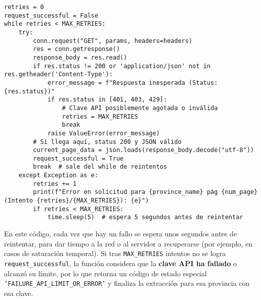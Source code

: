 \documentclass[a4paper,11pt]{book}
\begin{document}
\begin{lstlisting}[style=mypython, caption=Gestión de reintentos en la solicitud a la API.]
retries = 0
request_successful = False
while retries < MAX_RETRIES:
    try:
        conn.request("GET", params, headers=headers)
        res = conn.getresponse()
        response_body = res.read()
        if res.status != 200 or 'application/json' not in res.getheader('Content-Type'):
            error_message = f"Respuesta inesperada (Status: {res.status})"
            if res.status in [401, 403, 429]:
                # Clave API posiblemente agotada o inválida
                retries = MAX_RETRIES
                break
            raise ValueError(error_message)
        # Si llega aquí, status 200 y JSON válido
        current_page_data = json.loads(response_body.decode("utf-8"))
        request_successful = True
        break  # sale del while de reintentos
    except Exception as e:
        retries += 1
        print(f"Error en solicitud para {province_name} pág {num_page} (Intento {retries}/{MAX_RETRIES}): {e}")
        if retries < MAX_RETRIES:
            time.sleep(5)  # espera 5 segundos antes de reintentar
\end{lstlisting}

En este código, cada vez que hay un fallo se espera unos segundos antes de reintentar, para dar tiempo a la red o al servidor a recuperarse (por ejemplo, en casos de saturación temporal). Si tras \texttt{MAX\_RETRIES} intentos no se logra \texttt{request\_successful}, la función considera que la \textbf{clave API ha fallado} o alcanzó su límite, por lo que retorna un código de estado especial \texttt{'FAILURE\_API\_LIMIT\_OR\_ERROR'} y finaliza la extracción para esa provincia con esa clave.
\end{document}
